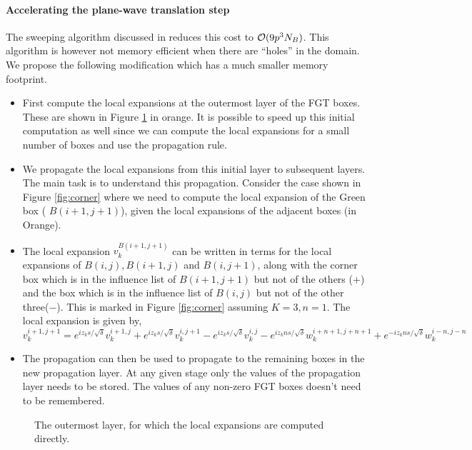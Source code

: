 \paragraph{Accelerating the plane-wave translation step}
The sweeping algorithm discussed in \cite{fggt} reduces this cost to $\mathcal{O}(9 p^3 N_B)$. 
This algorithm is however not memory efficient when there are ``holes'' in the domain. We propose the following modification which has a much smaller memory footprint.

\begin{itemize}
\item First compute the local expansions at the outermost layer of the FGT boxes. These are shown in Figure \ref{fig:outer} in orange. It is possible to speed up this initial computation as well since we can compute the local expansions for a small number of boxes and use the propagation rule.
\item We propagate the local expansions from this initial layer to subsequent layers. The main task is to understand this propagation. Consider the case shown in Figure \ref{fig:corner} where we need to compute the local expansion of the Green box ( $B(i+1,j+1)$), given the local expansions of the adjacent boxes (in Orange).
\item The local expansion $v_k^{B(i+1, j+1)}$ can be written in terms for the local expansions of $B(i,j), B(i+1,j)$ and $B(i,j+1)$, along with the corner box which is in the influence list of $B(i+1, j+1)$ but not of the others ($+$) and the box which is in the influence list of $B(i,j)$ but not of the other three($-$). This is marked in Figure \ref{fig:corner} assuming $K=3, n=1$. The local expansion is given by,
\[
	v_k^{i+1,j+1} = e^{iz_k s/\sqrt{\delta}} v_k^{i+1,j} + e^{iz_k s/\sqrt{\delta}} v_k^{i,j+1}
					- e^{iz_k s/\sqrt{\delta}} v_k^{i,j} - e^{iz_k ns/\sqrt{\delta}} w_k^{i+n+1,j+n+1} + e^{-iz_k ns/\sqrt{\delta}} w_k^{i-n,j-n}
\]
\item The propagation can then be used to propagate to the remaining boxes in the new propagation layer. At any given stage only the values of the propagation layer needs to be stored. The values of any non-zero FGT boxes doesn't need to be remembered.

\end{itemize}

\begin{figure}[h]
\centering
{}
\caption{\small The outermost layer, for which the local expansions are computed directly. 
}
\label{fig:outer}
\end{figure}



